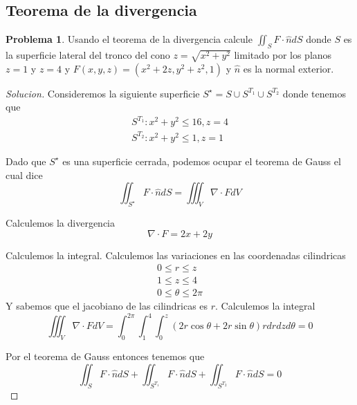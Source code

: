 \documentclass{article}
\theoremstyle{definition}
\newtheorem{problem}{Problema}
\newenvironment{solution}{\begin{proof}[Solucion]}{\end{proof}}
\begin{document}
\subsection{Teorema de la divergencia}
\begin{problem}
  Usando el teorema de la divergencia calcule $\iint_{S} F \cdot \hat{n} dS$ donde $S$ es la superficie lateral
  del tronco del cono $z = \sqrt{x^{2} + y^{2}}$ limitado por los planos $z = 1$ y $z = 4$ y
  $F(x, y, z) = (x^{2} + 2z, y^{2} + z^{2}, 1)$ y $\hat{n}$ es la normal exterior.
\end{problem}
\begin{solution}
  Consideremos la siguiente superficie $S^{\star} = S \cup S^{T_{1}} \cup S^{T_{2}}$ donde tenemos que
  \begin{gather*}
    S^{T_{1}}: x^{2} + y^{2} \leq 16, z = 4\\
    S^{T_{2}}: x^{2} + y^{2} \leq 1, z = 1
  \end{gather*}

  Dado que $S^{\star}$ es una superficie cerrada, podemos ocupar el teorema de Gauss el cual dice
  \begin{equation*}
    \iint_{S^{\star}} F \cdot \hat{n} dS = \iiint_{V} \nabla \cdot F dV
  \end{equation*}

  Calculemos la divergencia
  \begin{equation*}
    \nabla \cdot F = 2x + 2y
  \end{equation*}

  Calculemos la integral. Calculemos las variaciones en las coordenadas cilindricas
  \begin{gather*}
    0 \leq r \leq z\\
    1 \leq z \leq 4\\
    0 \leq \theta \leq 2\pi
  \end{gather*}
  Y sabemos que el jacobiano de las cilindricas es $r$. Calculemos la integral
  \begin{equation*}
    \iiint_{V} \nabla \cdot F dV = \int_{0}^{2\pi}\int_{1}^{4}\int_{0}^{z} (2r \cos \theta + 2r \sin \theta) r dr dz d \theta = 0
  \end{equation*}

  Por el teorema de Gauss entonces tenemos que
  \begin{equation*}
    \iint_{S} F \cdot \hat{n} dS + \iint_{S^{T_{1}}} F \cdot \hat{n} dS + \iint_{S^{T_{2}}} F \cdot \hat{n} dS = 0
  \end{equation*}


\end{solution}
\end{document}

